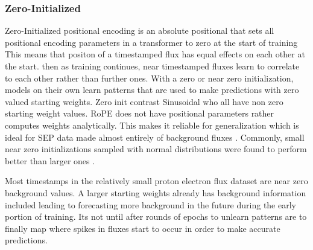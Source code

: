\subsubsection{Zero-Initialized}
Zero-Initialized positional encoding is an absolute positional that sets all  positional encoding parameters in a transformer to zero at the start of training This means that positon of a timestamped flux has equal effects on each other at the start. then as training continues, near timestamped fluxes learn to correlate to each other rather than further ones. With a zero or near zero initialization, models on their own learn patterns that are used to make predictions with zero valued starting weights. Zero init contrast Sinusoidal who all have non zero starting weight values. RoPE does not have positional parameters rather computes weights analytically. This makes it reliable for generalization which is ideal for SEP data made almost entirely of background fluxes \cite{torres2025machine}. Commonly, small near zero initializations sampled with normal distributions were found to perform better than larger ones \cite{ito2024learning}.

Most timestamps in the relatively small proton electron flux dataset are near zero background values. A larger starting weights already has background information included leading to forecasting more background in the future during the early portion of training. Its not until after rounds of epochs to unlearn patterns are to finally map where spikes in fluxes start to occur in order to make accurate predictions.
